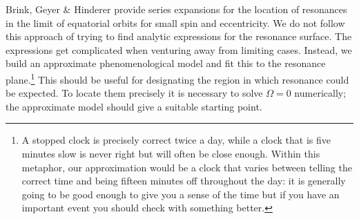 \documentclass[aps,prd,amsfonts,amssymb,amsmath,nofootinbib,reprint,showpacs]{revtex4-1}
\begin{document}
Brink, Geyer \& Hinderer \cite{Brink2013} provide series expansions for the location of resonances in the limit of equatorial orbits for small spin and eccentricity. We do not follow this approach of trying to find analytic expressions for the resonance surface. The expressions get complicated when venturing away from limiting cases. Instead, we build an approximate phenomenological model and fit this to the resonance plane.\footnote{A stopped clock is precisely correct twice a day, while a clock that is five minutes slow is never right but will often be close enough. Within this metaphor, our approximation would be a clock that varies between telling the correct time and being fifteen minutes off throughout the day: it is generally going to be good enough to give you a sense of the time but if you have an important event you should check with something better.} This should be useful for designating the region in which resonance could be expected. To locate them precisely it is necessary to solve $\Omega = 0$ numerically; the approximate model should give a suitable starting point.
\end{document}
